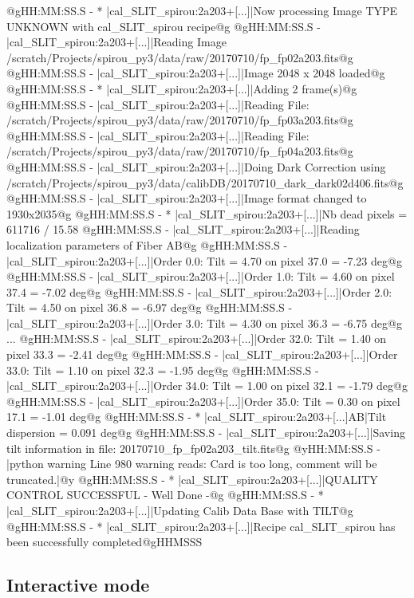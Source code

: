 \begin{cmdboxprintspecial}[fontupper=\tiny, fontlower=\tiny]
@gHH:MM:SS.S - * |cal_SLIT_spirou:2a203+[...]|Now processing Image TYPE UNKNOWN with cal_SLIT_spirou recipe@g
@gHH:MM:SS.S -   |cal_SLIT_spirou:2a203+[...]|Reading Image /scratch/Projects/spirou_py3/data/raw/20170710/fp_fp02a203.fits@g
@gHH:MM:SS.S -   |cal_SLIT_spirou:2a203+[...]|Image 2048 x 2048 loaded@g
@gHH:MM:SS.S - * |cal_SLIT_spirou:2a203+[...]|Adding 2 frame(s)@g
@gHH:MM:SS.S -   |cal_SLIT_spirou:2a203+[...]|Reading File: /scratch/Projects/spirou_py3/data/raw/20170710/fp_fp03a203.fits@g
@gHH:MM:SS.S -   |cal_SLIT_spirou:2a203+[...]|Reading File: /scratch/Projects/spirou_py3/data/raw/20170710/fp_fp04a203.fits@g
@gHH:MM:SS.S -   |cal_SLIT_spirou:2a203+[...]|Doing Dark Correction using /scratch/Projects/spirou_py3/data/calibDB/20170710_dark_dark02d406.fits@g
@gHH:MM:SS.S -   |cal_SLIT_spirou:2a203+[...]|Image format changed to 1930x2035@g
@gHH:MM:SS.S - * |cal_SLIT_spirou:2a203+[...]|Nb dead pixels = 611716 / 15.58 %
@gHH:MM:SS.S -   |cal_SLIT_spirou:2a203+[...]|Reading localization parameters of Fiber AB@g
@gHH:MM:SS.S -   |cal_SLIT_spirou:2a203+[...]|Order 0.0: Tilt = 4.70 on pixel 37.0 = -7.23 deg@g
@gHH:MM:SS.S -   |cal_SLIT_spirou:2a203+[...]|Order 1.0: Tilt = 4.60 on pixel 37.4 = -7.02 deg@g
@gHH:MM:SS.S -   |cal_SLIT_spirou:2a203+[...]|Order 2.0: Tilt = 4.50 on pixel 36.8 = -6.97 deg@g
@gHH:MM:SS.S -   |cal_SLIT_spirou:2a203+[...]|Order 3.0: Tilt = 4.30 on pixel 36.3 = -6.75 deg@g
...
@gHH:MM:SS.S -   |cal_SLIT_spirou:2a203+[...]|Order 32.0: Tilt = 1.40 on pixel 33.3 = -2.41 deg@g
@gHH:MM:SS.S -   |cal_SLIT_spirou:2a203+[...]|Order 33.0: Tilt = 1.10 on pixel 32.3 = -1.95 deg@g
@gHH:MM:SS.S -   |cal_SLIT_spirou:2a203+[...]|Order 34.0: Tilt = 1.00 on pixel 32.1 = -1.79 deg@g
@gHH:MM:SS.S -   |cal_SLIT_spirou:2a203+[...]|Order 35.0: Tilt = 0.30 on pixel 17.1 = -1.01 deg@g
@gHH:MM:SS.S - * |cal_SLIT_spirou:2a203+[...]AB|Tilt dispersion = 0.091 deg@g
@gHH:MM:SS.S -   |cal_SLIT_spirou:2a203+[...]|Saving tilt  information in file: 20170710_fp_fp02a203_tilt.fits@g
@yHH:MM:SS.S - \@ |python warning Line 980  warning reads: Card is too long, comment will be truncated.|@y
@gHH:MM:SS.S - * |cal_SLIT_spirou:2a203+[...]|QUALITY CONTROL SUCCESSFUL - Well Done -@g
@gHH:MM:SS.S - * |cal_SLIT_spirou:2a203+[...]|Updating Calib Data Base with TILT@g
@gHH:MM:SS.S - * |cal_SLIT_spirou:2a203+[...]|Recipe cal_SLIT_spirou has been successfully completed@gHHMSSS
\end{cmdboxprintspecial}

\newpage
\subsection{Interactive mode}

